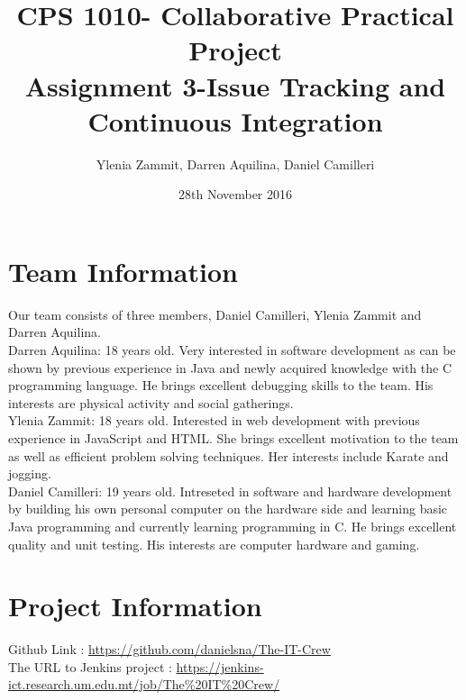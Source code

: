 \documentclass[UTF8]{article}
\begin{document}
\title{%
  CPS 1010- Collaborative Practical Project\\  
  \vspace{5mm}  
  \large Assignment 3-Issue Tracking and Continuous Integration}
\vspace{100mm}
\author{Ylenia Zammit, Darren Aquilina, Daniel Camilleri}
\date{28th November 2016} 
\maketitle

\newpage
\section{Team Information}
Our team consists of three members, Daniel Camilleri, Ylenia Zammit and Darren Aquilina.
\vspace{5mm}
\\
Darren Aquilina:
	18 years old. Very interested in software development as can be shown by previous experience in Java and newly acquired knowledge with the C programming language. 
	He brings excellent debugging skills to the team. His interests are physical activity and social gatherings.
\vspace{5mm}
\\
Ylenia Zammit:
	18 years old. Interested in web development with previous experience in JavaScript and HTML.
	She brings excellent motivation to the team as well as efficient problem solving techniques.
	Her interests include Karate and jogging.
\vspace{5mm}
\\
Daniel Camilleri: 19 years old. Intreseted in software and hardware development by building his own personal computer on the hardware side and learning basic Java programming and currently learning programming in C.
		  He brings excellent quality and unit testing. His interests are computer hardware and gaming.
\newpage
\section{Project Information}
Github Link : \url{https://github.com/danielsna/The-IT-Crew}
\vspace{5mm}
\\
The URL to Jenkins project : \url{https://jenkins-ict.research.um.edu.mt/job/The%20IT%20Crew/}
\newpage
\end{document}
